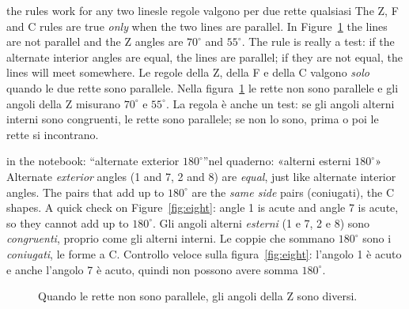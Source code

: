 \begin{trap}{the rules work for any two lines}{le regole valgono per due rette qualsiasi}
The Z, F and C rules are true \emph{only} when the two lines are parallel. In Figure~\ref{fig:notparallel} the lines are not parallel and the Z angles are $70^\circ$ and $55^\circ$. The rule is really a test: if the alternate interior angles are equal, the lines are parallel; if they are not equal, the lines will meet somewhere.
\tcblower
Le regole della Z, della F e della C valgono \emph{solo} quando le due rette sono parallele. Nella figura~\ref{fig:notparallel} le rette non sono parallele e gli angoli della Z misurano $70^\circ$ e $55^\circ$. La regola è anche un test: se gli angoli alterni interni sono congruenti, le rette sono parallele; se non lo sono, prima o poi le rette si incontrano.
\end{trap}

\begin{trap}{in the notebook: ``alternate exterior $180^\circ$''}{nel quaderno: «alterni esterni $180^\circ$»}
Alternate \emph{exterior} angles (1 and 7, 2 and 8) are \emph{equal}, just like alternate interior angles. The pairs that add up to $180^\circ$ are the \emph{same side} pairs (coniugati), the C shapes. A quick check on Figure~\ref{fig:eight}: angle 1 is acute and angle 7 is acute, so they cannot add up to $180^\circ$.
\tcblower
Gli angoli alterni \emph{esterni} (1 e 7, 2 e 8) sono \emph{congruenti}, proprio come gli alterni interni. Le coppie che sommano $180^\circ$ sono i \emph{coniugati}, le forme a C. Controllo veloce sulla figura~\ref{fig:eight}: l'angolo 1 è acuto e anche l'angolo 7 è acuto, quindi non possono avere somma $180^\circ$.
\end{trap}

\begin{figure}[htbp]
\centering
%
      {Quando le rette non sono parallele, gli angoli della Z sono diversi.}
\label{fig:notparallel}
\end{figure}

